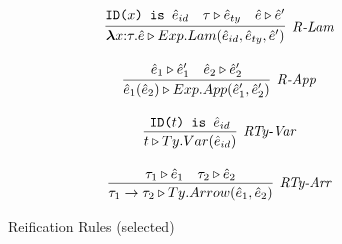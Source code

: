 \begin{figure}[t]
\begin{minipage}[t]{.44\textwidth}
\[\begin{array}{c}
\infer[\textit{R-Lam}]
	{ \boldsymbol\lambda x{:}\tau . \hat{e} \triangleright Exp.Lam( \hat{e}_{id}, \hat{e}_{ty}, \hat{e}' )  }
	{\texttt{ID($x$) is $\hat{e}_{id}$} & \tau \triangleright \hat{e}_{ty} & \hat{e} \triangleright \hat{e}'  } \\[3ex]

\infer[\textit{R-App}]
	{ \hat{e}_1(\hat{e}_2)  \triangleright Exp.App(\hat{e}'_1,\hat{e}'_2) }
	{ \hat{e}_1 \triangleright \hat{e}'_1  & \hat{e}_2 \triangleright \hat{e}'_2   } \\[3ex]

\infer[\textit{RTy-Var}]
	{ t \triangleright Ty.Var(\hat{e}_{id})   }
	{ \texttt{ID($t$) is $\hat{e}_{id}$}} \\[3ex]

\infer[\textit{RTy-Arr}]
	{ \tau_1 \rightarrow \tau_2 \triangleright Ty.Arrow(\hat{e}_1,\hat{e}_2 )  }
	{ \tau_1 \triangleright \hat{e}_1 & \tau_2 \triangleright \hat{e}_2 }
\end{array}
\]
\label{fig:reification}
\caption{Reification Rules (selected)}
\end{minipage}
\end{figure}

